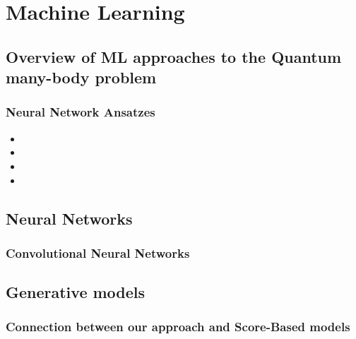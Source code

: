 
\chapter{Machine Learning}
\label{chapter4}

\ifpdf
\graphicspath{{Chapter4/Figs/Raster/}{Chapter4/Figs/PDF/}{Chapter4/Figs/}}
\else
\graphicspath{{Chapter4/Figs/Vector/}{Chapter4/Figs/}}
\fi

\section{Overview of ML approaches to the Quantum many-body problem}
\label{subsec:ml-overview}

\subsection{Neural Network Ansatzes}
\begin{itemize}
	\item
	\item
	\item
	\item
\end{itemize}

\section{Neural Networks}

\subsection{Convolutional Neural Networks}
\label{subsubsec:ml-cnn}

\section{Generative models}
\subsection{Connection between our approach and Score-Based models}
